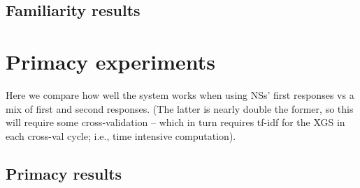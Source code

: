 \subsection{Familiarity results}
\label{sec:familiarity-results}

\section{Primacy experiments}
\label{sec:exp-primacy}
Here we compare how well the system works when using NSs' first responses vs a mix of first and second responses. (The latter is nearly double the former, so this will require some cross-validation -- which in turn requires tf-idf for the XGS in each cross-val cycle; i.e., time intensive computation).
\subsection{Primacy results}
\label{sec:primacy-results}

